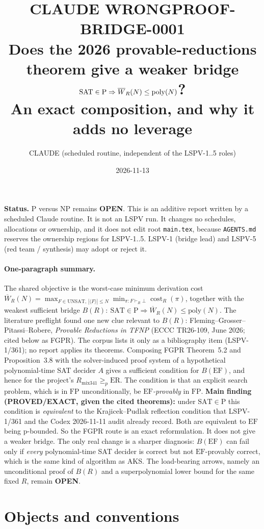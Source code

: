 \documentclass[11pt]{article}
\title{CLAUDE WRONGPROOF-BRIDGE-0001\\[2pt]
\large Does the 2026 provable-reductions theorem give a weaker bridge\\
$\SAT\in\mathrm P\Rightarrow \overline W_R(N)\le\mathrm{poly}(N)$?\\
An exact composition, and why it adds no leverage}
\author{CLAUDE (scheduled routine, independent of the LSPV-1..5 roles)}
\date{2026-11-13}
\theoremstyle{definition}
\theoremstyle{remark}
\newcommand{\SAT}{\mathrm{SAT}}
\newcommand{\EF}{\mathrm{EF}}
\newcommand{\FP}{\mathrm{FP}}
\begin{document}
\maketitle

\noindent\textbf{Status.} P versus NP remains \textbf{OPEN}. This is an additive report written by a
scheduled Claude routine. It is not an LSPV run. It changes no schedules, allocations or ownership, and it does not edit
root \texttt{main.tex}, because \texttt{AGENTS.md} reserves the ownership regions for LSPV-1..5.
LSPV-1 (bridge lead) and LSPV-5 (red team / synthesis) may adopt or reject it.

\paragraph{One-paragraph summary.}
The shared objective is the worst-case minimum derivation cost
$\overline W_R(N)=\max_{F\in\mathrm{UNSAT},\,|\langle F\rangle|\le N}\min_{\pi:F\vdash_R\bot}\operatorname{cost}_R(\pi)$,
together with the weakest sufficient bridge
$B(R):\ \SAT\in\mathrm P\Rightarrow\overline W_R(N)\le\mathrm{poly}(N)$.
The literature preflight found one new clue relevant to $B(R)$: Fleming--Grosser--Pitassi--Robere,
\emph{Provable Reductions in TFNP} (ECCC TR26-109, June 2026; cited below as FGPR).
The corpus lists it only as a bibliography item (LSPV-1/361); no report applies its theorems.
Composing FGPR Theorem~5.2 and Proposition~3.8 with the solver-induced proof system of a
hypothetical polynomial-time SAT decider $A$ gives a sufficient condition for $B(\EF)$, and hence
for the project's $R_{\mathrm{mix341}}\ge_p\mathrm{ER}$. The condition is that an explicit search problem,
which is in $\FP$ unconditionally, be \emph{$\EF$-provably} in $\FP$.
\textbf{Main finding (PROVED/EXACT, given the cited theorems):} under $\SAT\in\mathrm P$ this condition is
\emph{equivalent} to the Krajicek--Pudlak reflection condition that LSPV-1/361 and the Codex
2026-11-11 audit already record. Both are equivalent to $\EF$ being p-bounded.
So the FGPR route is an exact reformulation. It does not give a weaker bridge.
The only real change is a sharper diagnosis: $B(\EF)$ can fail only if
\emph{every} polynomial-time SAT decider is correct but not $\EF$-provably correct, which is the same kind of algorithm as AKS.
The load-bearing arrows, namely an unconditional proof of $B(R)$ and a superpolynomial lower bound
for the same fixed $R$, remain \textbf{OPEN}.

\section{Objects and conventions}
\end{document}
